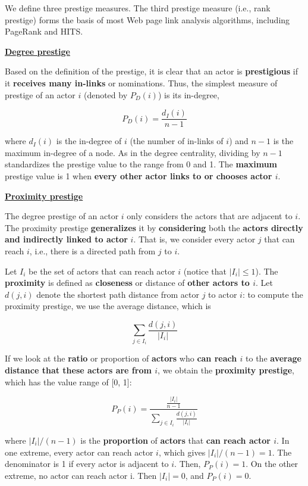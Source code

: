 We define three prestige measures. The third prestige measure (i.e., rank prestige) forms the basis of most Web page link analysis algorithms, including PageRank and HITS.

\underline{\textbf{Degree prestige}}

Based on the definition of the prestige, it is clear that an actor is \textbf{prestigious} if it \textbf{receives many in-links} or nominations. Thus, the simplest measure of prestige of an actor $i$ (denoted by $P_D(i)$) is its in-degree,

$$
P_D(i) = \frac{d_I(i)}{n-1}
$$

where $d_I(i)$ is the in-degree of $i$ (the number of in-links of $i$) and $n - 1$ is the maximum in-degree of a node. As in the degree centrality, dividing by $n - 1$ standardizes the prestige value to the range from 0 and 1. The \textbf{maximum} prestige value is 1 when \textbf{every other actor links to or chooses actor $i$}.

\underline{\textbf{Proximity prestige}}

The degree prestige of an actor $i$ only considers the actors that are adjacent to $i$. The proximity prestige \textbf{generalizes} it by \textbf{considering} both the \textbf{actors directly and indirectly linked to actor} $i$. That is, we consider every actor $j$ that can reach $i$, i.e., there is a directed path from $j$ to $i$. 

Let $I_i$ be the set of actors that can reach actor $i$ (notice that $|I_i| \leq 1$). The \textbf{proximity} is defined as \textbf{closeness} or distance of \textbf{other actors to $i$}. Let $d(j, i)$ denote the shortest path distance from actor $j$ to actor $i$: to compute the proximity prestige, we use the average distance, which is

$$
\sum_{j \in I_i} \frac{d(j,i)}{|I_i|}
$$

If we look at the \textbf{ratio} or proportion of \textbf{actors} who \textbf{can reach $i$} to the \textbf{average distance that these actors are from $i$}, we obtain the \textbf{proximity prestige}, which has the value range of [0, 1]:

$$
P_P(i) = \frac{\frac{|I_i|}{n-1}}{\sum_{j \in I_i} \frac{d(j,i)}{|I_i|}}
$$

where $|I_i|/(n-1)$ is the \textbf{proportion} of \textbf{actors} that \textbf{can reach actor $i$}. In one extreme, every actor can reach actor $i$, which gives $|I_i|/(n-1) = 1$. The denominator is 1 if every actor is adjacent to $i$. Then, $P_P(i) = 1$. On the other extreme, no actor can reach actor i. Then $|I_i| = 0$, and $P_P(i) = 0$.

